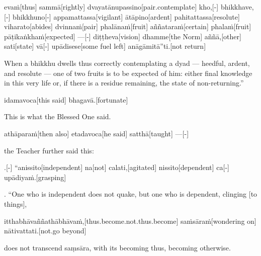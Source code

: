 \begin{samepage}
\begingl[glneveryline={\PaliGlossA,\PaliGlossB}]
evaṁ[thus] sammā[rightly] dvayatānupassino[pair.contemplate] kho,[-] bhikkhave,[-] bhikkhuno[-] appamattassa[vigilant] ātāpino[ardent] pahitattassa[resolute] viharato[abides] dvinnaṁ[pair] phalānaṁ[fruit] aññataraṁ[certain] phalaṁ[fruit] pāṭikaṅkhaṁ[expected] —[-] diṭṭheva[vision] dhamme[the Norm] aññā,[other] sati[state] vā[-] upādisese[some fuel left] anāgāmitā”ti.[not return]
\endgl
\nopagebreak
\linespread{0.5}
\begin{spacin}{0.2}
{\PaliGlossFT When a bhikkhu dwells thus correctly contemplating a dyad — heedful, ardent, and resolute — one of two fruits is to be expected of him: either final knowledge in this very life or, if there is a residue remaining, the state of non-returning.”}
\end{spacin}
\vskip 12pt
\end{samepage}
\begin{samepage}
\begingl[glneveryline={\PaliGlossA,\PaliGlossB}]
idamavoca[this said] bhagavā.[fortunate]
\endgl
\nopagebreak
\linespread{0.5}
\begin{spacin}{0.2}
{\PaliGlossFT This is what the Blessed One said.}
\end{spacin}
\vskip 12pt
\end{samepage}
\begin{samepage}
\begingl[glneveryline={\PaliGlossA,\PaliGlossB}]
athāparaṁ[then also] etadavoca[he said] satthā[taught] —[-]
\endgl
\nopagebreak
\linespread{0.5}
\begin{spacin}{0.2}
{\PaliGlossFT the Teacher further said this:}
\end{spacin}
\vskip 12pt
\end{samepage}
\vskip 0.2in
\begin{samepage}
.[-] “anissito[independent] na[not] calati,[agitated] nissito[dependent] ca[-] upādiyaṁ.[grasping]
\endgl
\nopagebreak
\linespread{0.5}
\begin{spacin}{0.2}
{. “One who is independent does not quake, but one who is dependent, clinging [to things],}
\end{spacin}
\vskip 12pt
\end{samepage}
\begin{samepage}
\begingl[glneveryline={\PaliGlossA,\PaliGlossB}]
itthabhāvaññathābhāvaṁ,[thus.become.not.thus.become] saṁsāraṁ[wondering on] nātivattati.[not.go beyond]
\endgl
\nopagebreak
\linespread{0.5}
\begin{spacin}{0.2}
{\PaliGlossFT does not transcend saṃsāra,  with its becoming thus, becoming otherwise.}
\end{spacin}
\vskip 12pt
\end{samepage}
